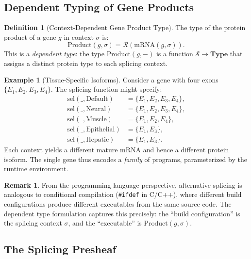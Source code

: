 \documentclass[12pt,a4paper]{article}
\theoremstyle{definition}
\newtheorem{definition}[theorem]{Definition}
\newtheorem{example}[theorem]{Example}
\newtheorem{remark}[theorem]{Remark}
\newcommand{\cat}[1]{\mathbf{#1}}
\begin{document}
\subsection{Dependent Typing of Gene Products}

\begin{definition}[Context-Dependent Gene Product Type]\label{def:dependent-type}
The type of the protein product of a gene $g$ in context $\sigma$ is:
\[
  \text{Product}(g, \sigma) = \mathcal{R}(\mathrm{mRNA}(g, \sigma)).
\]
This is a \emph{dependent type}: the type $\text{Product}(g, -)$ is a function $\mathcal{S} \to \cat{Type}$ that assigns a distinct protein type to each splicing context.
\end{definition}

\begin{example}[Tissue-Specific Isoforms]\label{ex:isoforms}
Consider a gene with four exons $\{E_1, E_2, E_3, E_4\}$. The splicing function might specify:
\begin{align*}
  \mathrm{sel}(\_, \text{Default})    &= \{E_1, E_2, E_3, E_4\}, \\
  \mathrm{sel}(\_, \text{Neural})     &= \{E_1, E_2, E_3, E_4\}, \\
  \mathrm{sel}(\_, \text{Muscle})     &= \{E_1, E_2, E_4\},       \\
  \mathrm{sel}(\_, \text{Epithelial}) &= \{E_1, E_3\},             \\
  \mathrm{sel}(\_, \text{Hepatic})    &= \{E_1, E_3\}.
\end{align*}
Each context yields a different mature mRNA and hence a different protein isoform. The single gene thus encodes a \emph{family} of programs, parameterized by the runtime environment.
\end{example}

\begin{remark}
From the programming language perspective, alternative splicing is analogous to conditional compilation (\texttt{\#ifdef} in C/C++), where different build configurations produce different executables from the same source code. The dependent type formulation captures this precisely: the ``build configuration'' is the splicing context $\sigma$, and the ``executable'' is $\text{Product}(g, \sigma)$.
\end{remark}

\subsection{The Splicing Presheaf}
\end{document}
